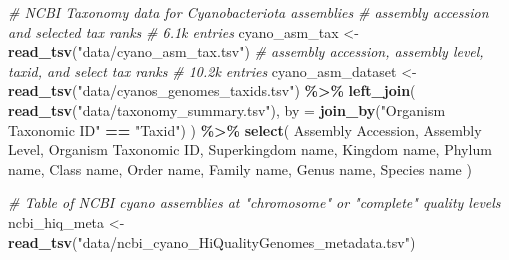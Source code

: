\documentclass[
]{article}
\newenvironment{Shaded}{\begin{snugshade}}{\end{snugshade}}
\newcommand{\AttributeTok}[1]{\textcolor[rgb]{0.13,0.29,0.53}{#1}}
\newcommand{\CommentTok}[1]{\textcolor[rgb]{0.56,0.35,0.01}{\textit{#1}}}
\newcommand{\FunctionTok}[1]{\textcolor[rgb]{0.13,0.29,0.53}{\textbf{#1}}}
\newcommand{\NormalTok}[1]{#1}
\newcommand{\OtherTok}[1]{\textcolor[rgb]{0.56,0.35,0.01}{#1}}
\newcommand{\SpecialCharTok}[1]{\textcolor[rgb]{0.81,0.36,0.00}{\textbf{#1}}}
\newcommand{\StringTok}[1]{\textcolor[rgb]{0.31,0.60,0.02}{#1}}
\begin{document}
\begin{Shaded}
\begin{Highlighting}[]
\CommentTok{\# NCBI Taxonomy data for Cyanobacteriota assemblies}
\CommentTok{\# assembly accession and selected tax ranks}
\CommentTok{\# 6.1k entries}
\NormalTok{cyano\_asm\_tax }\OtherTok{\textless{}{-}} \FunctionTok{read\_tsv}\NormalTok{(}\StringTok{"data/cyano\_asm\_tax.tsv"}\NormalTok{)}
\CommentTok{\# assembly accession, assembly level, taxid, and select tax ranks}
\CommentTok{\# 10.2k entries}
\NormalTok{cyano\_asm\_dataset }\OtherTok{\textless{}{-}} \FunctionTok{read\_tsv}\NormalTok{(}\StringTok{"data/cyanos\_genomes\_taxids.tsv"}\NormalTok{) }\SpecialCharTok{\%\textgreater{}\%}
  \FunctionTok{left\_join}\NormalTok{(}
    \FunctionTok{read\_tsv}\NormalTok{(}\StringTok{"data/taxonomy\_summary.tsv"}\NormalTok{), }
    \AttributeTok{by =} \FunctionTok{join\_by}\NormalTok{(}\StringTok{"Organism Taxonomic ID"} \SpecialCharTok{==} \StringTok{"Taxid"}\NormalTok{)}
\NormalTok{  ) }\SpecialCharTok{\%\textgreater{}\%}
  \FunctionTok{select}\NormalTok{(}
    \StringTok{\textasciigrave{}}\AttributeTok{Assembly Accession}\StringTok{\textasciigrave{}}\NormalTok{,}
    \StringTok{\textasciigrave{}}\AttributeTok{Assembly Level}\StringTok{\textasciigrave{}}\NormalTok{,}
    \StringTok{\textasciigrave{}}\AttributeTok{Organism Taxonomic ID}\StringTok{\textasciigrave{}}\NormalTok{,}
    \StringTok{\textasciigrave{}}\AttributeTok{Superkingdom name}\StringTok{\textasciigrave{}}\NormalTok{,}
    \StringTok{\textasciigrave{}}\AttributeTok{Kingdom name}\StringTok{\textasciigrave{}}\NormalTok{,}
    \StringTok{\textasciigrave{}}\AttributeTok{Phylum name}\StringTok{\textasciigrave{}}\NormalTok{,}
    \StringTok{\textasciigrave{}}\AttributeTok{Class name}\StringTok{\textasciigrave{}}\NormalTok{,}
    \StringTok{\textasciigrave{}}\AttributeTok{Order name}\StringTok{\textasciigrave{}}\NormalTok{,}
    \StringTok{\textasciigrave{}}\AttributeTok{Family name}\StringTok{\textasciigrave{}}\NormalTok{,}
    \StringTok{\textasciigrave{}}\AttributeTok{Genus name}\StringTok{\textasciigrave{}}\NormalTok{,}
    \StringTok{\textasciigrave{}}\AttributeTok{Species name}\StringTok{\textasciigrave{}}
\NormalTok{  )}

\CommentTok{\# Table of NCBI cyano assemblies at "chromosome" or "complete" quality levels}
\NormalTok{ncbi\_hiq\_meta }\OtherTok{\textless{}{-}} \FunctionTok{read\_tsv}\NormalTok{(}\StringTok{"data/ncbi\_cyano\_HiQualityGenomes\_metadata.tsv"}\NormalTok{)}


\end{Highlighting}
\end{Shaded}
\end{document}

